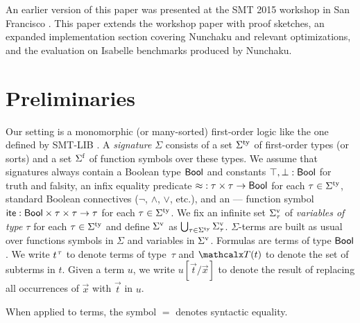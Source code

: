 An earlier version of this paper was presented at the SMT 2015 workshop in San
Francisco \cite{reynolds-et-al-2015-smt}. This paper extends the workshop
paper with proof sketches, an expanded implementation section covering
Nunchaku and relevant \cvc optimizations, %
and the evaluation on Isabelle benchmarks produced by Nunchaku.


\section{Preliminaries}
\label{sec:prelim}

Our setting is a monomorphic (or many-sorted) first-order logic
like the one defined by SMT-LIB \cite{smtlib25}.
A \emph{signature} $\Sigma$ consists of
a set $\stypes{\Sigma}$ of %
first-order types
%
(or sorts) and a set $\sfuns{\Sigma}$ of function symbols over these types.
We assume that signatures always contain a Boolean type $\mathsf{Bool}$ and constants
$\top, \bot : \mathsf{Bool}$ for truth and falsity,
an infix equality predicate ${\approx} : \tau \times \tau \to \mathsf{Bool}$
for each $\tau \in \stypes{\Sigma}$,
standard Boolean connectives ($\neg$, $\wedge$, $\vee$, etc.),
and an ---- function symbol
$\mathsf{ite} : \mathsf{Bool} \times \tau \times \tau \rightarrow \tau$
for each $\tau \in \stypes{\Sigma}$.
%
We fix an infinite set $\svars{\Sigma}_\tau$ of \emph{variables of type $\tau$}
for each $\tau \in \stypes{\Sigma}$ and
define $\svars{\Sigma}$ as $\bigcup_{\tau \in \stypes{\Sigma}} \svars{\Sigma}_\tau$.
$\Sigma$-terms are built as usual over functions symbols in $\Sigma$ and variables in $\svars{\Sigma}$.
%
Formulas are terms of type $\mathsf{Bool}$.
We write $t\typ{\tau}$ to denote %
terms of type~$\tau$ and $\terms( t )$ to denote the set of subterms in $t$.
Given a term $u$, we write $u[\vec t/\vec x]$ to denote the result of replacing
all occurrences of $\vec x$ with $\vec t$ in $u$.
\begin{rep}When applied to terms, the symbol $=$ denotes syntactic equality.\end{rep}

